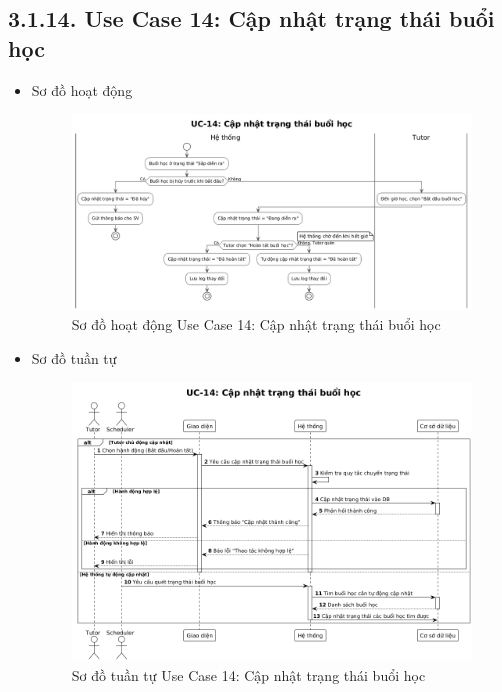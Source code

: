 \subsection*{3.1.14. Use Case 14: Cập nhật trạng thái buổi học}
\begin{itemize}
    \item Sơ đồ hoạt động
    \begin{figure}[H]
    \centering
    \includegraphics[scale=0.35 ]{Picture/ACUC14.png}
    \caption{Sơ đồ hoạt động Use Case 14: Cập nhật trạng thái buổi học}
    \end{figure}
    \item Sơ đồ tuần tự
    \begin{figure}[H]
    \centering
    \includegraphics[scale=0.35 ]{Picture/SEUC14.png}
    \caption{Sơ đồ tuần tự Use Case 14: Cập nhật trạng thái buổi học}
    \end{figure}
\end{itemize}
